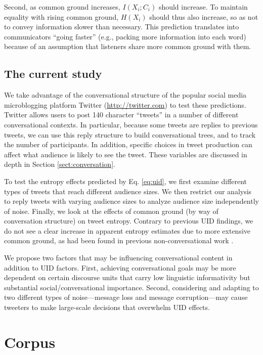 \documentclass[11pt,letterpaper]{article}
\begin{document}
Second, as common ground increases, $I(X_i;C_i)$ should increase. To maintain equality with rising common ground, $H(X_i)$ should thus also increase, so as not to convey information slower than necessary. This prediction translates into communicators ``going faster'' (e.g., packing more information into each word) because of an assumption that listeners share more common ground with them.

\subsection{The current study}

We take advantage of the conversational structure of the popular social media microblogging platform Twitter (\url{http://twitter.com}) to test these predictions.  Twitter allows users to post 140 character ``tweets'' in a number of different conversational contexts. In particular,  because some tweets are replies to previous tweets, we can use this reply structure to build conversational trees, and to track the number of participants.  In addition, specific choices in tweet production can affect what audience is likely to see the tweet.  These variables are discussed in depth in Section \ref{sect:conversation}.

To test the entropy effects predicted by Eq. \ref{eq:uid}, we first examine different types of tweets that reach different audience sizes.  We then restrict our analysis to reply tweets with varying audience sizes to analyze audience size independently of noise.  Finally, we look at the effects of common ground (by way of conversation structure) on tweet entropy. Contrary to previous UID findings, we do not see a clear increase in apparent entropy estimates due to more extensive common ground, as had been found in previous non-conversational work \cite{genzel2002,qian2012,doyle2015}.  

We propose two factors that may be influencing conversational content in addition to UID factors.  First, achieving conversational goals may be more dependent on certain discourse units that carry low linguistic informativity but substantial social/conversational importance.  Second, considering and adapting to two different types of noise---message loss and message corruption---may cause tweeters to make large-scale decisions that overwhelm UID effects.

\section{Corpus}
\end{document}
